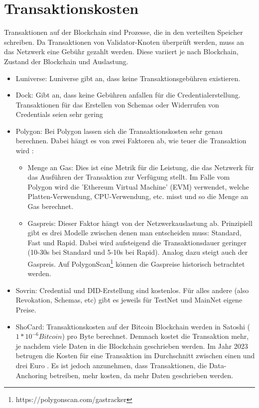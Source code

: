 \section{Transaktionskosten}
Transaktionen auf der Blockchain sind Prozesse, die in den verteilten Speicher schreiben. Da Transaktionen von Validator-Knoten überprüft werden, muss an das Netzwerk eine Gebühr gezahlt werden. Diese variiert je nach Blockchain, Zustand der Blockchain und Auslastung.
\begin{itemize}
	\item Luniverse: Luniverse gibt an, dass keine Transaktionsgebühren existieren.
	\item Dock: Gibt an, dass keine Gebühren anfallen für die Credentialerstellung. Transaktionen für das Erstellen von Schemas oder Widerrufen von Credentials seien sehr gering \cite{ID44}
	\item Polygon: Bei Polygon lassen sich die Transaktionskosten sehr genau berechnen. Dabei hängt es von zwei Faktoren ab, wie teuer die Transaktion wird \cite{ID45}:
	\begin{itemize}
		\item Menge an Gas: Dies ist eine Metrik für die Leistung, die das Netzwerk für das Ausführen der Transaktion zur Verfügung stellt. Im Falle vom Polygon wird die 'Ethereum Virtual Machine' (EVM) verwendet, welche Platten-Verwendung, CPU-Verwendung, etc. misst und so die Menge an Gas berechnet.
		\item Gaspreis: Dieser Faktor hängt von der Netzwerkauslastung ab. Prinzipiell gibt es drei Modelle zwischen denen man entscheiden muss: Standard, Fast und Rapid. Dabei wird aufsteigend die Transaktionsdauer geringer (10-30s bei Standard und 5-10s bei Rapid). Analog dazu steigt auch der Gaspreis. Auf PolygonScan\footnote{https://polygonscan.com/gastracker} können die Gaspreise historisch betrachtet werden.
	\end{itemize}
	\item Sovrin: Credential und DID-Erstellung sind kostenlos. Für alles andere (also Revokation, Schemas, etc) gibt es jeweils für TestNet und MainNet eigene Preise.
	\item ShoCard: Transaktionskosten auf der Bitcoin Blockchain werden in Satoshi ($1 * 10^{-6} Bitcoin$) pro Byte berechnet. Demnach kostet die Transaktion mehr, je nachdem viele Daten in die Blockchain geschrieben werden. Im Jahr 2023 betrugen die Kosten für eine Transaktion im Durchschnitt zwischen einen und drei Euro \cite{ID49}. Es ist jedoch anzunehmen, dass Transaktionen, die Data-Anchoring betreiben, mehr kosten, da mehr Daten geschrieben werden.
	
\end{itemize}

